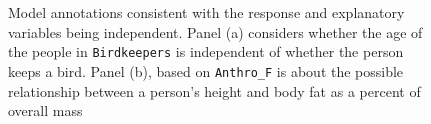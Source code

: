 \documentclass[
  letterpaper,
  DIV=11,
  numbers=noendperiod,
  oneside]{scrartcl}
\begin{document}
\begin{figure}


\caption{\label{fig-independence.column-page-right}Model annotations
consistent with the response and explanatory variables being
independent. Panel (a) considers whether the age of the people in
\texttt{Birdkeepers} is independent of whether the person keeps a bird.
Panel (b), based on \texttt{Anthro\_F} is about the possible
relationship between a person's height and body fat as a percent of
overall mass}

\end{figure}%
\end{document}
